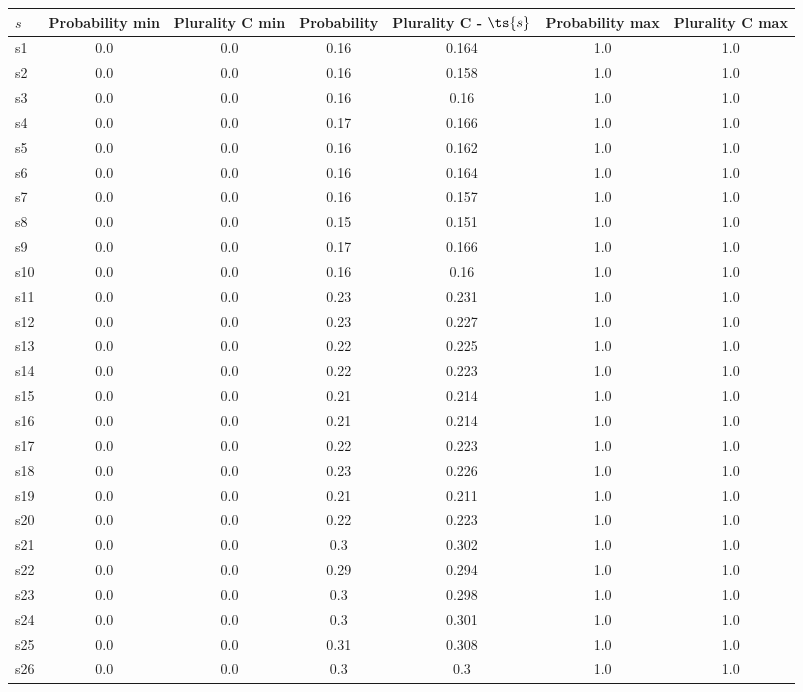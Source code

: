 \documentclass{article}
\begin{document}
\noindent\begin{tabular}{|l|c|c|c|c|c|c|}
\hline
$s$& Probability min & Plurality C min & Probability & Plurality C - $\ts{s}$ & Probability max & Plurality C max\\
\hline
s1 &0.0 & 0.0 & 0.16 & 0.164 & 1.0 & 1.0\\
\hline
s2 &0.0 & 0.0 & 0.16 & 0.158 & 1.0 & 1.0\\
\hline
s3 &0.0 & 0.0 & 0.16 & 0.16 & 1.0 & 1.0\\
\hline
s4 &0.0 & 0.0 & 0.17 & 0.166 & 1.0 & 1.0\\
\hline
s5 &0.0 & 0.0 & 0.16 & 0.162 & 1.0 & 1.0\\
\hline
s6 &0.0 & 0.0 & 0.16 & 0.164 & 1.0 & 1.0\\
\hline
s7 &0.0 & 0.0 & 0.16 & 0.157 & 1.0 & 1.0\\
\hline
s8 &0.0 & 0.0 & 0.15 & 0.151 & 1.0 & 1.0\\
\hline
s9 &0.0 & 0.0 & 0.17 & 0.166 & 1.0 & 1.0\\
\hline
s10 &0.0 & 0.0 & 0.16 & 0.16 & 1.0 & 1.0\\
\hline
s11 &0.0 & 0.0 & 0.23 & 0.231 & 1.0 & 1.0\\
\hline
s12 &0.0 & 0.0 & 0.23 & 0.227 & 1.0 & 1.0\\
\hline
s13 &0.0 & 0.0 & 0.22 & 0.225 & 1.0 & 1.0\\
\hline
s14 &0.0 & 0.0 & 0.22 & 0.223 & 1.0 & 1.0\\
\hline
s15 &0.0 & 0.0 & 0.21 & 0.214 & 1.0 & 1.0\\
\hline
s16 &0.0 & 0.0 & 0.21 & 0.214 & 1.0 & 1.0\\
\hline
s17 &0.0 & 0.0 & 0.22 & 0.223 & 1.0 & 1.0\\
\hline
s18 &0.0 & 0.0 & 0.23 & 0.226 & 1.0 & 1.0\\
\hline
s19 &0.0 & 0.0 & 0.21 & 0.211 & 1.0 & 1.0\\
\hline
s20 &0.0 & 0.0 & 0.22 & 0.223 & 1.0 & 1.0\\
\hline
s21 &0.0 & 0.0 & 0.3 & 0.302 & 1.0 & 1.0\\
\hline
s22 &0.0 & 0.0 & 0.29 & 0.294 & 1.0 & 1.0\\
\hline
s23 &0.0 & 0.0 & 0.3 & 0.298 & 1.0 & 1.0\\
\hline
s24 &0.0 & 0.0 & 0.3 & 0.301 & 1.0 & 1.0\\
\hline
s25 &0.0 & 0.0 & 0.31 & 0.308 & 1.0 & 1.0\\
\hline
s26 &0.0 & 0.0 & 0.3 & 0.3 & 1.0 & 1.0\\
\hline

\end{tabular}
\end{document}
